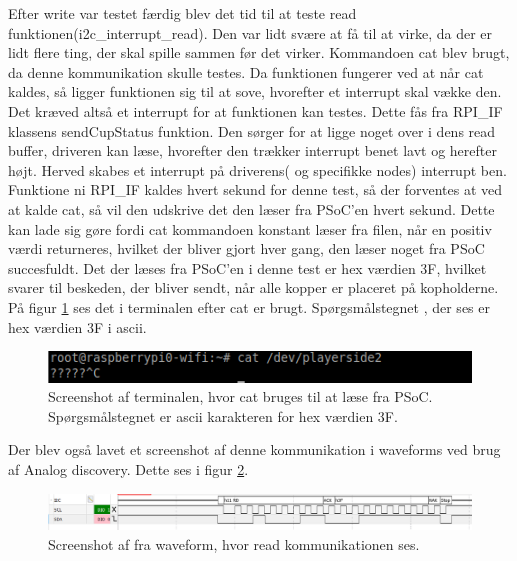 \documentclass[Modultest/Modultest_main.tex]{subfiles}
\begin{document}
Efter write var testet færdig blev det tid til at teste read funktionen(i2c\_interrupt\_read). Den var lidt svære at få til at virke, da der er lidt flere ting, der skal spille sammen før det virker. Kommandoen cat blev brugt, da denne kommunikation skulle testes. Da funktionen fungerer ved at når cat kaldes, så ligger funktionen sig til at sove, hvorefter et interrupt skal vække den. Det kræved altså et interrupt for at funktionen kan testes. Dette fås fra RPI\_IF klassens sendCupStatus funktion. Den sørger for at ligge noget over i dens read buffer, driveren kan læse, hvorefter den trækker interrupt benet lavt og herefter højt. Herved skabes et interrupt på driverens( og specifikke nodes) interrupt ben. Funktione ni RPI\_IF kaldes hvert sekund for denne test, så der forventes at ved at kalde cat, så vil den udskrive det den læser fra PSoC'en hvert sekund. Dette kan lade sig gøre fordi cat kommandoen konstant læser fra filen, når en positiv værdi returneres, hvilket der bliver gjort hver gang, den læser noget fra PSoC succesfuldt. Det der læses fra PSoC'en i denne test er hex værdien 3F, hvilket svarer til beskeden, der bliver sendt, når alle kopper er placeret på kopholderne. På figur \ref{fig:read_terminal} ses det i terminalen efter cat er brugt. Spørgsmålstegnet , der ses er hex værdien 3F i ascii. 
\begin{figure}[H]
    \centering
    \includegraphics[width=\textwidth]{Modultest/i2c_interruptDriver/graphics/read_terminal.PNG}
    \caption{Screenshot af terminalen, hvor cat bruges til at læse fra PSoC. Spørgsmålstegnet er ascii karakteren for hex værdien 3F.}
    \label{fig:read_terminal}
\end{figure}
Der blev også lavet et screenshot af denne kommunikation i waveforms ved brug af Analog discovery. Dette ses i figur \ref{fig:read_analog}.
\begin{figure}[H]
    \centering
    \includegraphics[width=\textwidth]{Modultest/i2c_interruptDriver/graphics/read_analog.PNG}
    \caption{Screenshot af fra waveform, hvor read kommunikationen ses.}
    \label{fig:read_analog}
\end{figure}
\end{document}

